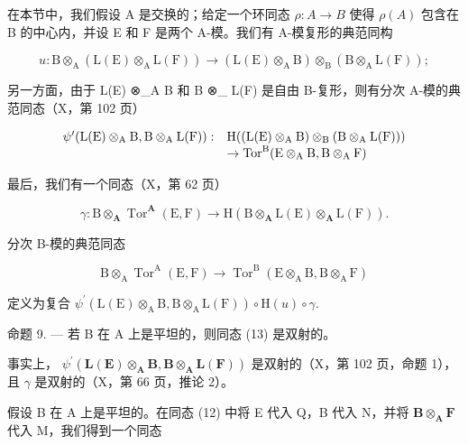 在本节中，我们假设 A 是交换的；给定一个环同态 \(\rho: A \to B\) 使得 \(\rho(A)\) 包含在 B 的中心内，并设 E 和 F 是两个 A-模。我们有 A-模复形的典范同构

\[
u: \mathrm{B} \otimes_ {\mathrm{A}} (\mathrm{L} (\mathrm{E}) \otimes_ {\mathrm{A}} \mathrm{L} (\mathrm{F})) \rightarrow (\mathrm{L} (\mathrm{E}) \otimes_ {\mathrm{A}} \mathrm{B}) \otimes_ {\mathrm{B}} (\mathrm{B} \otimes_ {\mathrm{A}} \mathrm{L} (\mathrm{F}));
\]

另一方面，由于 L(E) ⊗\_A B 和 B ⊗\_ L(F) 是自由 B-复形，则有分次 A-模的典范同态（X，第 102 页）

\[
\begin{array}{r l} \psi^ {\prime} (\mathrm{L(E)} \otimes_ {\mathrm{A}} \mathrm{B}, \mathrm{B} \otimes_ {\mathrm{A}} \mathrm{L(F)}): & \mathrm{H} ((\mathrm{L(E)} \otimes_ {\mathrm{A}} \mathrm{B}) \otimes_ {\mathrm{B}} (\mathrm{B} \otimes_ {\mathrm{A}} \mathrm{L(F)})) \\ & \to \operatorname{Tor} ^ {\mathrm{B}} (\mathrm{E} \otimes_ {\mathrm{A}} \mathrm{B}, \mathrm{B} \otimes_ {\mathrm{A}} \mathrm{F}) \end{array}
\]

最后，我们有一个同态（X，第 62 页）

\[
\gamma : \mathrm{B} \otimes_ {\mathbf {A}} \operatorname{Tor} ^ {\mathbf {A}} (\mathrm{E}, \mathrm{F}) \rightarrow \mathrm{H} (\mathrm{B} \otimes_ {\mathbf {A}} \mathrm{L} (\mathrm{E}) \otimes_ {\mathbf {A}} \mathrm{L} (\mathrm{F})) .
\]

分次 B-模的典范同态

\[
\mathrm{B} \otimes_ {\mathrm{A}} \operatorname{Tor} ^ {\mathrm{A}} (\mathrm{E}, \mathrm{F}) \rightarrow \operatorname{Tor} ^ {\mathrm{B}} (\mathrm{E} \otimes_ {\mathrm{A}} \mathrm{B}, \mathrm{B} \otimes_ {\mathrm{A}} \mathrm{F})\tag{13}
\]

定义为复合 \(\psi^{\prime}(\mathrm{L}(\mathrm{E})\otimes_{\mathrm{A}}\mathrm{B},\mathrm{B}\otimes_{\mathrm{A}}\mathrm{L}(\mathrm{F}))\circ \mathrm{H}(u)\circ \gamma .\)

命题 9. --- 若 B 在 A 上是平坦的，则同态 (13) 是双射的。

事实上， \(\psi^{\prime}(\mathbf{L}(\mathbf{E})\otimes_{\mathbf{A}}\mathbf{B},\mathbf{B}\otimes_{\mathbf{A}}\mathbf{L}(\mathbf{F}))\) 是双射的（X，第 102 页，命题 1），且 \(\gamma\) 是双射的（X，第 66 页，推论 2）。

假设 B 在 A 上是平坦的。在同态 (12) 中将 E 代入 Q，B 代入 N，并将 \(\mathbf{B} \otimes_{\mathbf{A}} \mathbf{F}\) 代入 M，我们得到一个同态


